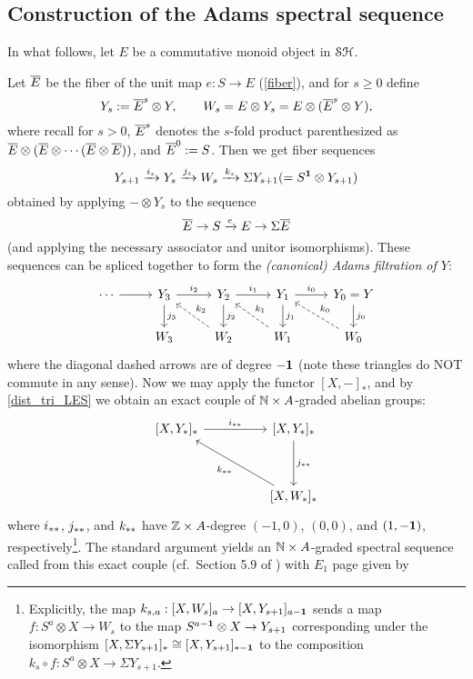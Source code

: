 \documentclass[../main.tex]{subfiles}
\begin{document}
\subsection{Construction of the Adams spectral sequence}

In what follows, let $E$ be a commutative monoid object in $\mathcal{SH}$.

\begin{definition}\label{mASS}
	Let $\overline E$ be the fiber of the unit map $e:S\to E$ (\autoref{fiber}), and for $s\geq0$ define
	\[Y_s:=\overline E^s\otimes Y,\qquad W_s = E\otimes Y_s=E\otimes(\overline E^s\otimes Y),\]
	where recall for $s>0$, $\overline E^s$ denotes the $s$-fold product parenthesized as $\overline E\otimes(\overline E\otimes\cdots(\overline E\otimes\overline E))$, and $\overline E^0:=S$. Then we get fiber sequences
	\[Y_{s+1}\xrightarrow{i_s}Y_s\xrightarrow{j_s} W_s\xrightarrow{k_s}\Sigma Y_{s+1}(=S^{\mathbf{1}}\otimes Y_{s+1})\]
	obtained by applying $-\otimes Y_s$ to the sequence
	\[\overline E\to S\xrightarrow eE\to\Sigma\overline E\]
	(and applying the necessary associator and unitor isomorphisms). These sequences can be spliced together to form the \emph{(canonical) Adams filtration of $Y$}:
	\[\begin{tikzcd}
		\cdots & {Y_3} & {Y_2} & {Y_1} & {Y_0=Y} \\
		& {W_3} & {W_2} & {W_1} & {W_0}
		\arrow[from=1-1, to=1-2]
		\arrow["{i_2}", from=1-2, to=1-3]
		\arrow["{i_1}", from=1-3, to=1-4]
		\arrow["{i_0}", from=1-4, to=1-5]
		\arrow["{j_0}", from=1-5, to=2-5]
		\arrow["{k_0}"', dashed, from=2-5, to=1-4]
		\arrow["{j_1}", from=1-4, to=2-4]
		\arrow["{k_1}"', dashed, from=2-4, to=1-3]
		\arrow["{j_3}", from=1-2, to=2-2]
		\arrow["{j_2}", from=1-3, to=2-3]
		\arrow["{k_2}"', dashed, from=2-3, to=1-2]
	\end{tikzcd}\]
	where the diagonal dashed arrows are of degree $-\mathbf{1}$ (note these triangles do NOT commute in any sense). Now we may apply the functor $[X,-]_\ast$, and by \autoref{dist_tri_LES} we obtain an exact couple of $\mathbb{N}\times A$-graded abelian groups:
	\[\begin{tikzcd}
		{[X,Y_\ast]_\ast} && {[X,Y_\ast]_\ast} \\
		\\
		&& {[X,W_\ast]_\ast}
		\arrow["{i_\aast}", from=1-1, to=1-3]
		\arrow["{j_\aast}", from=1-3, to=3-3]
		\arrow["{k_\aast}", from=3-3, to=1-1]
	\end{tikzcd}\]
	where $i_{\ast\ast}$, $j_{\ast\ast}$, and $k_{\ast\ast}$ have $\mathbb{Z}\times A$-degree $(-1,0)$, $(0,0)$, and $(1,-\mathbf{1})$, respectively\footnote{Explicitly, the map $k_{s,a}:[X,W_s]_a\to [X,Y_{s+1}]_{a-\mathbf{1}}$ sends a map $f:S^a\otimes X\to W_s$ to the map $S^{a-\mathbf{1}}\otimes X\to Y_{s+1}$ corresponding under the isomorphism $[X,\Sigma Y_{s+1}]_\ast\cong[X,Y_{s+1}]_{\ast-\mathbf{1}}$ to the composition $k_s\circ f:S^a\otimes X\to\Sigma Y_{s+1}$.}. The standard argument yields an $\mathbb{N}\times A$-graded spectral sequence called from this exact couple (cf.\ Section 5.9 of \cite{Weibel_1994}) with $E_1$ page given by 

\end{definition}
\end{document}
